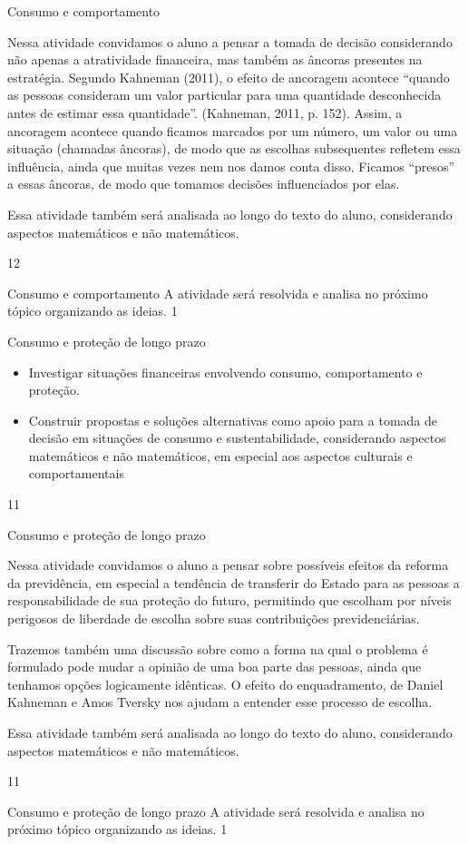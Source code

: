 \begin{sugestions}{Consumo e comportamento}
{
Nessa atividade convidamos o aluno a pensar a tomada de decisão considerando não apenas a atratividade financeira, mas também as âncoras presentes na estratégia. Segundo Kahneman (2011), o efeito de ancoragem acontece “quando as pessoas consideram um valor particular para uma quantidade desconhecida antes de estimar essa quantidade”. (Kahneman, 2011, p. 152). Assim, a ancoragem acontece quando ficamos marcados por um número, um valor ou uma situação (chamadas âncoras), de modo que as escolhas subsequentes refletem essa influência, ainda que muitas vezes nem nos damos conta disso. Ficamos “presos” a essas âncoras, de modo que tomamos decisões influenciados por elas.

Essa atividade também será analisada ao longo do texto do aluno, considerando aspectos matemáticos e não matemáticos. 

}{1}{2}
\end{sugestions}
\begin{answer}{Consumo e comportamento}
{
A atividade será resolvida e analisa no próximo tópico organizando as ideias.
}{1}
\end{answer}
\clearmargin
\begin{objectives}{Consumo e proteção de longo prazo}
{
\begin{itemize}
\item Investigar situações financeiras envolvendo consumo, comportamento e proteção.
\item Construir propostas e soluções alternativas como apoio para a tomada de decisão em situações de consumo e sustentabilidade, considerando aspectos matemáticos e não matemáticos, em especial aos aspectos culturais e comportamentais
\end{itemize}
}{1}{1}
\end{objectives}
\begin{sugestions}{Consumo e proteção de longo prazo}
{
Nessa atividade convidamos o aluno a pensar sobre possíveis efeitos da reforma da previdência, em especial a tendência de transferir do Estado para as pessoas a responsabilidade de sua proteção do futuro, permitindo que escolham por níveis perigosos de liberdade de escolha sobre suas contribuições previdenciárias.

Trazemos também uma discussão sobre como a forma na qual o problema é formulado pode mudar a opinião de uma boa parte das pessoas, ainda que tenhamos opções logicamente idênticas. O efeito do enquadramento, de Daniel Kahneman e Amos Tversky nos ajudam a entender esse processo de escolha.

Essa atividade também será analisada ao longo do texto do aluno, considerando aspectos matemáticos e não matemáticos. 
}{1}{1}
\end{sugestions}
\begin{answer}{Consumo e proteção de longo prazo}
{
A atividade será resolvida e analisa no próximo tópico organizando as ideias.
}{1}
\end{answer}


